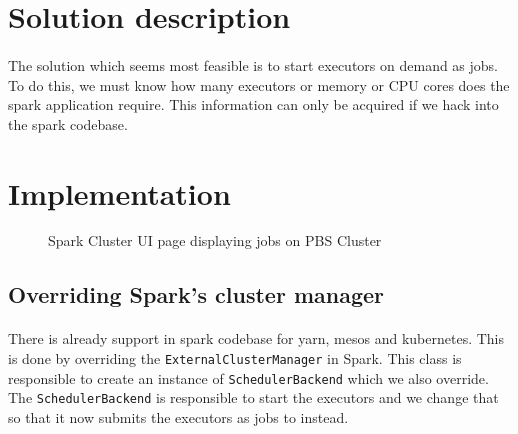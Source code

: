\section{Solution description}

\paragraph{}
The solution which seems most feasible is to start \glspl{executor} on
demand as  jobs. To do this, we must know how many executors or
memory or CPU cores does the spark application require. This information can
only be acquired if we hack into the \gls{spark} codebase.


\section{Implementation}

\begin{figure}[h]
    \centering
    \caption{Spark Cluster UI page displaying jobs on PBS Cluster}
\end{figure}

\subsection{Overriding Spark's cluster manager}
\paragraph{}
There is already support in \gls{spark} codebase for \gls{yarn}, \gls{mesos} and
\gls{kubernetes}. This is done by overriding the \texttt{ExternalClusterManager}
in Spark. This class is responsible to create an instance of
\texttt{SchedulerBackend} which we also override. The \texttt{SchedulerBackend}
is responsible to start the \glspl{executor} and we change that so that it
now submits the \glspl{executor} as jobs to  instead.

